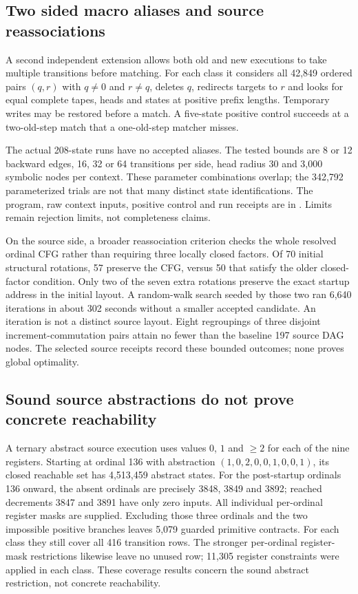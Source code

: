 \documentclass[11pt,letterpaper]{article}
\begin{document}
\subsection{Two sided macro aliases and source reassociations}
A second independent extension allows both old and new executions to take
multiple transitions before matching. For each class it considers all 42,849
ordered pairs $(q,r)$ with $q\ne0$ and $r\ne q$, deletes $q$, redirects targets
to $r$ and looks for equal complete tapes, heads and states at positive prefix
lengths. Temporary writes may be restored before a match. A five-state positive
control succeeds at a two-old-step match that a one-old-step matcher misses.

The actual 208-state runs have no accepted aliases. The tested bounds are
8 or 12 backward edges, 16, 32 or 64 transitions per side, head radius 30 and
3,000 symbolic nodes per context. These parameter combinations overlap; the
342,792 parameterized trials are not that many distinct state identifications.
The program, raw context inputs, positive control and run receipts are in
. Limits remain rejection limits, not completeness claims.

On the source side, a broader reassociation criterion checks the whole resolved
ordinal CFG rather than requiring three locally closed factors. Of 70 initial
structural rotations, 57 preserve the CFG, versus 50 that satisfy the older
closed-factor condition. Only two of the seven extra rotations preserve the
exact startup address in the initial layout. A random-walk search seeded by
those two ran 6,640 iterations in about 302 seconds without a smaller accepted
candidate. An iteration is not a distinct source layout. Eight regroupings of
three disjoint increment-commutation pairs attain no fewer than the baseline
197 source DAG nodes. The selected source receipts record these bounded
outcomes; none proves global optimality.

\subsection{Sound source abstractions do not prove concrete reachability}
A ternary abstract source execution uses values $0$, $1$ and $\geq2$ for each
of the nine registers. Starting at ordinal 136 with abstraction
$(1,0,2,0,0,1,0,0,1)$, its closed reachable set has 4,513,459 abstract states.
For the post-startup ordinals 136 onward, the absent ordinals are precisely
3848, 3849 and 3892; reached decrements 3847 and 3891 have only zero inputs.
All individual per-ordinal register masks are supplied. Excluding those three
ordinals and the two impossible positive branches leaves 5,079 guarded
primitive contracts. For each class they still cover all 416 transition rows.
The stronger per-ordinal register-mask restrictions likewise leave no unused
row; 11,305 register constraints were applied in each class. These coverage
results concern the sound abstract restriction, not concrete reachability.
\end{document}
